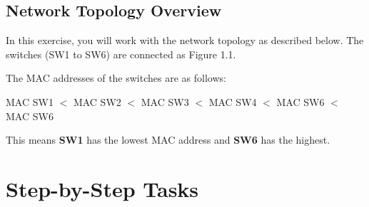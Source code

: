 \documentclass[a4paper]{book}
\begin{document}
\subsection*{Network Topology Overview}
In this exercise, you will work with the network topology as described below. The switches (SW1 to SW6) are connected as Figure 1.1.



The MAC addresses of the switches are as follows:
\begin{center}
	{MAC SW1 $<$ MAC SW2 $<$ MAC SW3 $<$ MAC SW4 $<$ MAC SW6 $<$ MAC SW6}
\end{center}
This means \textbf{SW1} has the lowest MAC address and \textbf{SW6} has the highest.
\newpage
\section*{Step-by-Step Tasks}
\end{document}
